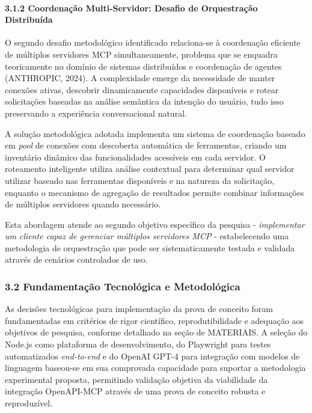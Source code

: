 \documentclass[
]{article}
\begin{document}
\paragraph{3.1.2 Coordenação Multi-Servidor: Desafio de Orquestração
Distribuída}\label{coordenauxe7uxe3o-multi-servidor-desafio-de-orquestrauxe7uxe3o-distribuuxedda}

O segundo desafio metodológico identificado relaciona-se à coordenação
eficiente de múltiplos servidores MCP simultaneamente, problema que se
enquadra teoricamente no domínio de sistemas distribuídos e coordenação
de agentes (ANTHROPIC, 2024). A complexidade emerge da necessidade de
manter conexões ativas, descobrir dinamicamente capacidades disponíveis
e rotear solicitações baseadas na análise semântica da intenção do
usuário, tudo isso preservando a experiência conversacional natural.

A solução metodológica adotada implementa um sistema de coordenação
baseado em \emph{pool} de conexões com descoberta automática de
ferramentas, criando um inventário dinâmico das funcionalidades
acessíveis em cada servidor. O roteamento inteligente utiliza análise
contextual para determinar qual servidor utilizar baseado nas
ferramentas disponíveis e na natureza da solicitação, enquanto o
mecanismo de agregação de resultados permite combinar informações de
múltiplos servidores quando necessário.

Esta abordagem atende ao segundo objetivo específico da pesquisa -
\emph{implementar um cliente capaz de gerenciar múltiplos servidores
MCP} - estabelecendo uma metodologia de orquestração que pode ser
sistematicamente testada e validada através de cenários controlados de
uso.

\subsubsection{3.2 Fundamentação Tecnológica e
Metodológica}\label{fundamentauxe7uxe3o-tecnoluxf3gica-e-metodoluxf3gica}

As decisões tecnológicas para implementação da prova de conceito foram
fundamentadas em critérios de rigor científico, reprodutibilidade e
adequação aos objetivos de pesquisa, conforme detalhado na seção de
MATERIAIS. A seleção do Node.js como plataforma de desenvolvimento, do
Playwright para testes automatizados \emph{end-to-end} e do OpenAI GPT-4
para integração com modelos de linguagem baseou-se em sua comprovada
capacidade para suportar a metodologia experimental proposta, permitindo
validação objetiva da viabilidade da integração OpenAPI-MCP através de
uma prova de conceito robusta e reproduzível.
\end{document}
